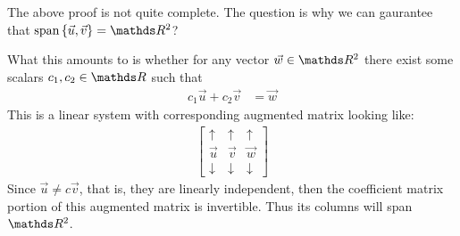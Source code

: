 \documentclass[11pt]{article}
\newcommand{\vek}[1]{\vec{#1}}
\begin{document}
\vspace{1cm}

The above proof is not quite complete. The question is why we can gaurantee that $\text{span} \left\{ \vek{u}, \vek{v} \right\} = \bbR^2$?

What this amounts to is whether for any vector $\vek{w} \in \bbR^2$ there exist some scalars $c_1, c_2 \in \bbR$ such that
\begin{align*}
c_1 \vek{u} + c_2 \vek{v} &= \vek{w}
\end{align*}
This is a linear system with corresponding augmented matrix looking like:
\begin{align*}
\begin{bmatrix}
\uparrow & \uparrow & \uparrow
\\
\vek{u} & \vek{v} & \vek{w}
\\
\downarrow & \downarrow & \downarrow
\end{bmatrix}
\end{align*}
Since $\vek{u} \neq c \vek{v}$, that is, they are linearly independent, then the coefficient matrix portion of this augmented matrix is invertible. Thus its columns will span $\bbR^2$.
\end{document}
